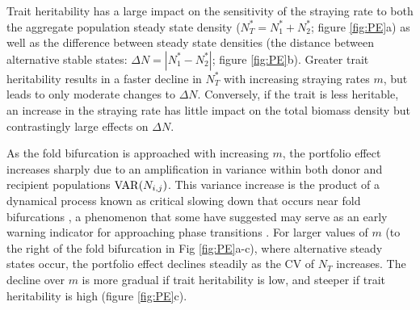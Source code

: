 \documentclass[twocolumn,preprintnumbers,amsmath,amssymb,superscriptaddress]{revtex4}
\begin{document}
Trait heritability has a large impact on the sensitivity of the straying rate to both the aggregate population steady state density ($N^*_T=N^*_1+N^*_2$; figure \ref{fig:PE}a) as well as the difference between steady state densities (the distance between alternative stable states: $\Delta N=|N^*_1-N^*_2|$; figure \ref{fig:PE}b).
Greater trait heritability results in a faster decline in $N_T^*$ with increasing straying rates $m$, but leads to only moderate changes to $\Delta N$.
Conversely, if the trait is less heritable, an increase in the straying rate has little impact on the total biomass density but contrastingly large effects on $\Delta N$.






As the fold bifurcation is approached with increasing $m$, the portfolio effect increases sharply due to an amplification in variance within both donor and recipient populations ${\rm VAR}(N_{i,j})$.
This variance increase is the product of a dynamical process known as critical slowing down that occurs near fold bifurcations \cite{Scheffer:2009gg}, a phenomenon that some have suggested may serve as an early warning indicator for approaching phase transitions \cite{Scheffer:2009gg,Lade:2012eu,Anonymous:2013br,Dakos:2014br}.
For larger values of $m$ (to the right of the fold bifurcation in Fig \ref{fig:PE}a-c), where alternative steady states occur, the portfolio effect declines steadily as the CV of $N_T$ increases.
The decline over $m$ is more gradual if trait heritability is low, and steeper if trait heritability is high (figure \ref{fig:PE}c).
\end{document}
